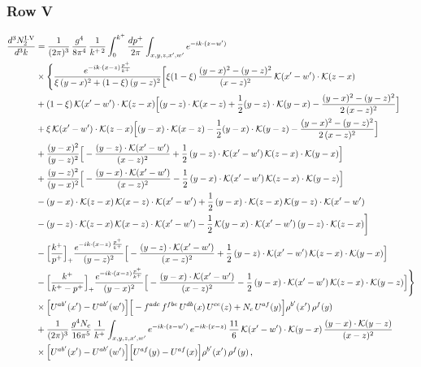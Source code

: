 \documentclass[9pt]{article}
\numberwithin{equation}{section}
\begin{document}
\subsubsection*{Row V}
\begin{align}
\frac{d^{3}N^{\rm I.V}_{2}}{d^{3}k} & =\frac{1}{(2\pi)^{3}}\,\frac{g^{4}}{8\pi^{4}}\,\frac{1}{k^{+\,2}}\int_{0}^{k^{+}}\frac{dp^{+}}{2\pi}\int_{x,y,z,x',w'}e^{-ik\cdot(z-w')}\notag\\
&\times\Bigg\{\frac{e^{-ik\cdot(x-z)\frac{p^{+}}{k^{+}}}}{\xi\,(y-x)^{2}+(1-\xi)\,(y-z)^{2}}\bigg[\xi(1-\xi)\,\frac{(y-x)^{2}-(y-z)^{2}}{(x-z)^{2}}\,\mathcal{K}(x'-w')\cdot\mathcal{K}(z-x)\notag\\
&+(1-\xi)\,\mathcal{K}(x'-w')\cdot\mathcal{K}(z-x)\Big[(y-z)\cdot\mathcal{K}(x-z)+\frac{1}{2}(y-z)\cdot\mathcal{K}(y-x)-\frac{(y-x)^{2}-(y-z)^{2}}{2\,(x-z)^{2}}\Big]\notag\\
&+\xi\,\mathcal{K}(x'-w')\cdot\mathcal{K}(z-x)\Big[(y-x)\cdot\mathcal{K}(x-z)-\frac{1}{2}(y-x)\cdot\mathcal{K}(y-z)-\frac{(y-x)^{2}-(y-z)^{2}}{2\,(x-z)^{2}}\Big]\notag\\
&+\frac{(y-x)^{2}}{(y-z)^{2}}\Big[-\frac{(y-z)\cdot\mathcal{K}(x'-w')}{(x-z)^{2}}+\frac{1}{2}\,(y-z)\cdot\mathcal{K}(x'-w')\,\mathcal{K}(z-x)\cdot\mathcal{K}(y-x)\Big]\notag\\
&+\frac{(y-z)^{2}}{(y-x)^{2}}\Big[-\frac{(y-x)\cdot\mathcal{K}(x'-w')}{(x-z)^{2}}-\frac{1}{2}\,(y-x)\cdot\mathcal{K}(x'-w')\,\mathcal{K}(z-x)\cdot\mathcal{K}(y-z)\Big]\notag\\
&-(y-x)\cdot\mathcal{K}(z-x)\,\mathcal{K}(x-z)\cdot\mathcal{K}(x'-w')+\frac{1}{2}\,(y-x)\cdot\mathcal{K}(z-x)\,\mathcal{K}(y-z)\cdot\mathcal{K}(x'-w')\notag\\
&-(y-z)\cdot\mathcal{K}(z-x)\,\mathcal{K}(x-z)\cdot\mathcal{K}(x'-w')-\frac{1}{2}\,\mathcal{K}(y-x)\cdot\mathcal{K}(x'-w')\,(y-z)\cdot\mathcal{K}(z-x)\bigg]\notag\\
&-\Big[\frac{k^{+}}{p^{+}}\Big]_{+}\frac{e^{-ik\cdot(x-z)\,\frac{p^{+}}{k^{+}}}}{(y-z)^{2}}\Big[-\frac{(y-z)\cdot\mathcal{K}(x'-w')}{(x-z)^{2}}+\frac{1}{2}\,(y-z)\cdot\mathcal{K}(x'-w')\,\mathcal{K}(z-x)\cdot\mathcal{K}(y-x)\Big]\notag\\
&-\Big[\frac{k^{+}}{k^{+}-p^{+}}\Big]_{+}\frac{e^{-ik\cdot(x-z)\frac{p^{+}}{k^{+}}}}{(y-x)^{2}}\Big[-\frac{(y-x)\cdot\mathcal{K}(x'-w')}{(x-z)^{2}}-\frac{1}{2}\,(y-x)\cdot\mathcal{K}(x'-w')\,\mathcal{K}(z-x)\cdot\mathcal{K}(y-z)\Big]\Bigg\}\notag\\
&\times\Big[U^{ab'}(x')-U^{ab'}(w')\Big]\Big[-f^{adc}\,f^{fbe}\,U^{db}(x)\,U^{ce}(z)+N_{c}\,U^{af}(y)\Big]\rho^{b'}(x')\,\rho^{f}(y)\notag\\
&+\frac{1}{(2\pi)^{3}}\,\frac{g^{4}N_{c}}{16\pi^{5}}\,\frac{1}{k^{+}}\int_{x,y,z,x',w'}e^{-ik\cdot(z-w')}\,e^{-ik\cdot(x-z)}\,\frac{11}{6}\,\mathcal{K}(x'-w')\cdot\mathcal{K}(y-x)\,\frac{(y-x)\cdot\mathcal{K}(y-z)}{(x-z)^{2}}\notag\\
&\times\Big[U^{ab'}(x')-U^{ab'}(w')\Big]\Big[U^{af}(y)-U^{af}(x)\Big]\rho^{b'}(x')\,\rho^{f}(y)\,,\label{eq:B-I5two}
\end{align}
\end{document}
